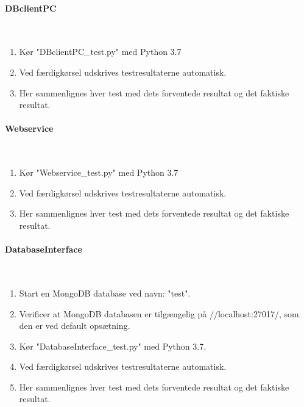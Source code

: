 \begin{appendices}
\paragraph{DBclientPC} \mbox{}\\
\begin{enumerate}
	\item Kør "DBclientPC\_test.py" med Python 3.7
	\item Ved færdigkørsel udskrives testresultaterne automatisk.
	\item Her sammenlignes hver test med dets forventede resultat og det faktiske resultat.
\end{enumerate}

\pagebreak
\paragraph{Webservice} \mbox{}\\
\begin{enumerate}
	\item Kør "Webservice\_test.py" med Python 3.7
	\item Ved færdigkørsel udskrives testresultaterne automatisk.
	\item Her sammenlignes hver test med dets forventede resultat og det faktiske resultat.
\end{enumerate}

\paragraph{DatabaseInterface} \mbox{}\\
\begin{enumerate}
	\item Start en MongoDB database ved navn: "test".
	\item Verificer at MongoDB databasen er tilgængelig på //localhost:27017/, som den er ved default opsætning.
	\item Kør "DatabaseInterface\_test.py" med Python 3.7.
	\item Ved færdigkørsel udskrives testresultaterne automatisk.
	\item Her sammenlignes hver test med dets forventede resultat og det faktiske resultat.
\end{enumerate}


\end{appendices}
